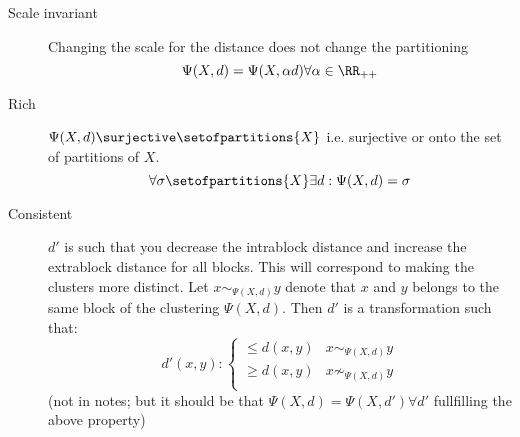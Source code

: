 \begin{description}
    \item[Scale invariant]
        Changing the scale for the distance does not change the partitioning
        \begin{equation}
            \Psi(X, d) = \Psi(X, \alpha d) \forall \alpha\in \RR_{++}
        \end{equation}
    \item[Rich]
        $\Psi(X, d)\surjective\setofpartitions{X}$ i.e. surjective or onto the
        set of partitions of $X$.
        \begin{equation}
            \forall \sigma\setofpartitions{X} \exists d : \Psi(X, d)=\sigma
        \end{equation}
    \item[Consistent]
        $d'$ is such that you decrease the intrablock distance and increase the
        extrablock distance for all blocks. This will correspond to making the
        clusters more distinct. Let $x \sim_{\Psi(X, d)} y$ denote that $x$ and
        $y$ belongs to the same block of the clustering $\Psi(X, d)$. Then $d'$
        is a transformation such that:
        \begin{equation}
            d'(x, y) : \begin{cases}
                \le d(x, y) & x\sim_{\Psi(X, d)} y\\
                \ge d(x, y) & x\not\sim_{\Psi(X, d)} y\\
            \end{cases}
        \end{equation}
        (not in notes; but it should be that $\Psi(X, d)=\Psi(X, d')\forall d'$
        fullfilling the above property)
\end{description}





